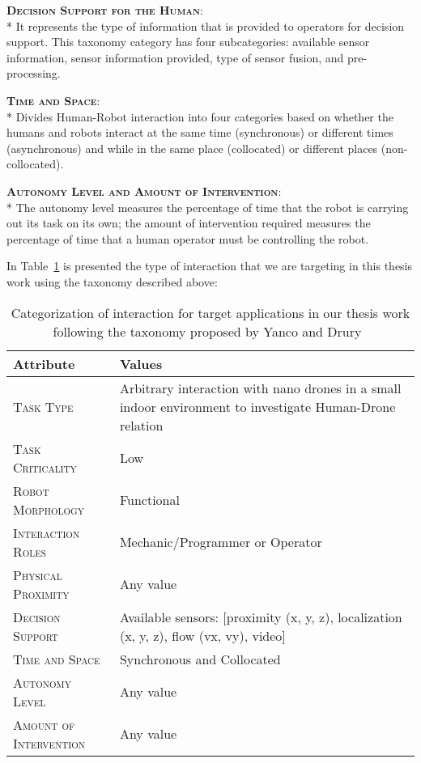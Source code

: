 {\bfseries \scshape Decision Support for the Human}:\\*
It represents the type of information that is provided to operators for decision support. 
This taxonomy category has four subcategories: available sensor information, sensor information provided, type of sensor fusion, and pre-processing.

{\bfseries \scshape Time and Space}:\\*
Divides Human-Robot interaction into four categories based on whether the humans and robots interact at the same time (synchronous) 
or different times (asynchronous) and while in the same place (collocated) or different places (non-collocated).

{\bfseries \scshape Autonomy Level and Amount of Intervention}:\\*
The autonomy level measures the percentage of time that the robot is carrying out its task on its own; 
the amount of intervention required measures the percentage of time that a human operator must be controlling the robot.

In Table~\ref{table:taxonomy_target} is presented the type of interaction that we are targeting in this thesis work using the taxonomy described above:

\begin{table}[H]
\centering
    \begin{tabular}{|p{}|m{}|}
    \hline
    \rowcolor{bluepoli!40}
    \textbf{Attribute} & \textbf{Values} \\
    \hline \hline
    {\scshape Task Type} & Arbitrary interaction with nano drones in a small indoor environment to investigate Human-Drone relation \\
    \hline
    {\scshape Task Criticality} & Low \\
    \hline
    {\scshape Robot Morphology} & Functional \\
    \hline
    {\scshape Interaction Roles} & Mechanic/Programmer or Operator \\
    \hline
    {\scshape Physical Proximity} &  Any value \\
    \hline
    {\scshape Decision Support} & Available sensors: [proximity (x, y, z), localization (x, y, z), flow (vx, vy), video] \\
    \hline
    {\scshape Time and Space} & Synchronous and Collocated \\
    \hline
    {\scshape Autonomy Level} & Any value \\
    \hline
    {\scshape Amount of Intervention} & Any value \\
    \hline
    \end{tabular}
    \\[10pt]
    \caption[Taxonomy for interaction of target applications]{Categorization of interaction for target applications in our thesis work following the taxonomy proposed by Yanco and Drury~\cite{yanco2004taxonomy}}\label{table:taxonomy_target}
\end{table}


